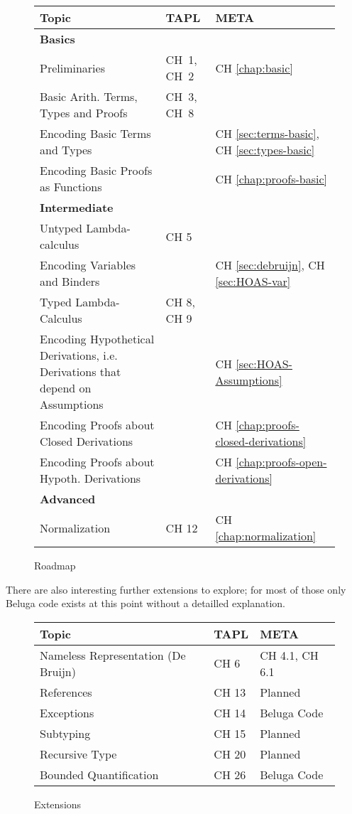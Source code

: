\begin{figure}
  \centering
\begin{tabular}{p{8cm}|p{2.4cm}|p{3.25cm}}
 Topic & TAPL & META \\
\hline
\textbf{Basics} & & \\\hline\hline
Preliminaries & CH~1, CH~2 & CH \ref{chap:basic}\\
Basic Arith. Terms, Types and Proofs & CH~3, CH~8 &  \\
\hline
Encoding Basic Terms and Types & & CH \ref{sec:terms-basic}, CH \ref{sec:types-basic} \\
Encoding Basic Proofs as Functions & & CH \ref{chap:proofs-basic} \\
\hline  \hline
\textbf{Intermediate} & & \\\hline \hline
Untyped Lambda-calculus & CH 5  & \\
Encoding Variables and Binders & & CH \ref{sec:debruijn}, CH \ref{sec:HOAS-var} \\
\hline
Typed Lambda-Calculus & CH 8, CH 9  & \\
Encoding Hypothetical Derivations, i.e. Derivations that depend on
Assumptions & & CH \ref{sec:HOAS-Assumptions}\\
Encoding Proofs about Closed Derivations & & CH \ref{chap:proofs-closed-derivations} \\
Encoding Proofs about Hypoth. Derivations & & CH \ref{chap:proofs-open-derivations} \\
\hline\hline
\textbf{Advanced} & & \\\hline \hline
Normalization & CH 12 & CH \ref{chap:normalization}\\
\end{tabular}
  \caption{Roadmap}
  \label{fig:roadmap}
\end{figure}
There are also interesting further extensions to explore; for most of those only Beluga code exists at this point without a detailled explanation.

\begin{figure}
\begin{tabular}{p{9cm}|p{2.25cm}|p{2.75cm}}
 Topic & TAPL & META \\
\hline
Nameless Representation (De Bruijn) & CH 6 & CH 4.1, CH 6.1 \\
References & CH 13 & Planned \\
Exceptions & CH 14 & Beluga Code \\
Subtyping & CH 15 & Planned \\
Recursive Type & CH 20 & Planned\\
Bounded Quantification & CH 26 & Beluga Code \\
\end{tabular}
  \caption{Extensions}
  \label{fig:extensions}
\end{figure}


